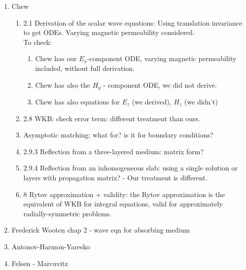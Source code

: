 \documentclass[twocolumn,secnumarabic,amssymb, nobibnotes, aps, prd]{revtex4-1}
\begin{document}
\begin{enumerate}
\begin{enumerate}
\end{enumerate}
\item Chew
\begin{enumerate}
\item 2.1 Derivation of the scalar wave equations: Using translation invariance to get ODEs. Varying magnetic permeability considered.\\ 
To check: 
\begin{enumerate}
\item Chew has our $E_x$-component ODE, varying magnetic permeability included, without full derivation.
\item Chew has also the $H_y$ - component ODE, we did not derive.
\item Chew has also equations for $E_z$ (we derived), $H_z$ (we didn't) 
\end{enumerate} 
\item 2.8 WKB: check error term: different  treatment than ours. 
\item Asymptotic matching: what for? is it for boundary conditions?
\item 2.9.3 Reflection from a three-layered medium: matrix form? 
\item 2.9.4 Reflection from an inhomogeneous slab: using a single solution or layers with propagation matrix? - Our treatment is different.
\item 8 Rytov approximation + validity: the Rytov approximation is the equivalent of WKB for integral equations, valid for approximately radially-symmetric problems.
\end{enumerate}
 
\item Frederick Wooten chap 2 - wave eqn for absorbing medium
\item Antonov-Harmon-Yaresko
\item Felsen - Marcuvitz
\end{enumerate}
\end{document}
